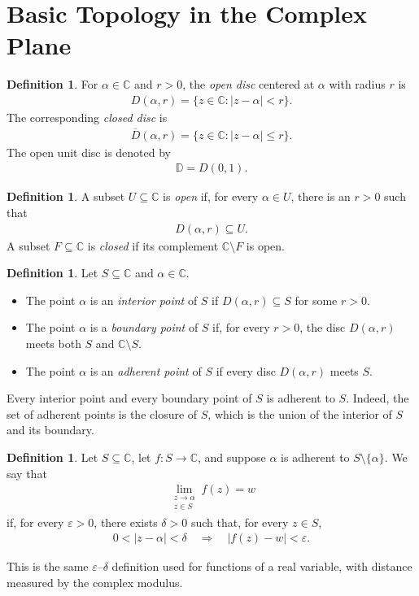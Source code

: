 \documentclass[11pt]{article}
\theoremstyle{plain}
\theoremstyle{definition}
\newtheorem{definition}[theorem]{Definition}
\theoremstyle{remark}
\numberwithin{equation}{section}
\newcommand{\be}{\begin{eqnarray}}
\newcommand{\ee}{\end{eqnarray}}
\newcommand{\C}{\mathbb{C}}
\newcommand{\D}{\mathbb{D}}
\begin{document}
\section{Basic Topology in the Complex Plane}

\begin{definition}
For $\alpha\in\C$ and $r>0$, the \emph{open disc} centered at $\alpha$ with
radius $r$ is
\be
  D(\alpha,r)=\{z\in\C:|z-\alpha|<r\}.
\ee
The corresponding \emph{closed disc} is
\be
  \overline{D}(\alpha,r)=\{z\in\C:|z-\alpha|\le r\}.
\ee
The open unit disc is denoted by
\be
  \D=D(0,1).
\ee
\end{definition}

\begin{definition}
A subset $U\subseteq\C$ is \emph{open} if, for every $\alpha\in U$, there is
an $r>0$ such that
\be
  D(\alpha,r)\subseteq U.
\ee
A subset $F\subseteq\C$ is \emph{closed} if its complement $\C\setminus F$
is open.
\end{definition}

\begin{definition}
Let $S\subseteq\C$ and $\alpha\in\C$.
\begin{itemize}
  \item The point $\alpha$ is an \emph{interior point} of $S$ if
    $D(\alpha,r)\subseteq S$ for some $r>0$.
  \item The point $\alpha$ is a \emph{boundary point} of $S$ if, for every
    $r>0$, the disc $D(\alpha,r)$ meets both $S$ and $\C\setminus S$.
  \item The point $\alpha$ is an \emph{adherent point} of $S$ if every disc
    $D(\alpha,r)$ meets $S$.
\end{itemize}
\end{definition}

Every interior point and every boundary point of $S$ is adherent to $S$.
Indeed, the set of adherent points is the closure of $S$, which is the union
of the interior of $S$ and its boundary.


\begin{definition}
Let $S\subseteq\C$, let $f:S\to\C$, and suppose $\alpha$ is adherent to
$S\setminus\{\alpha\}$.  We say that
\be
  \lim_{\substack{z\to\alpha\\ z\in S}} f(z)=w
\ee
if, for every $\varepsilon>0$, there exists $\delta>0$ such that, for every
$z\in S$,
\be
  0<|z-\alpha|<\delta
  \quad\Longrightarrow\quad
  |f(z)-w|<\varepsilon.
\ee
\end{definition}

This is the same $\varepsilon$--$\delta$ definition used for functions of a
real variable, with distance measured by the complex modulus.
\end{document}
